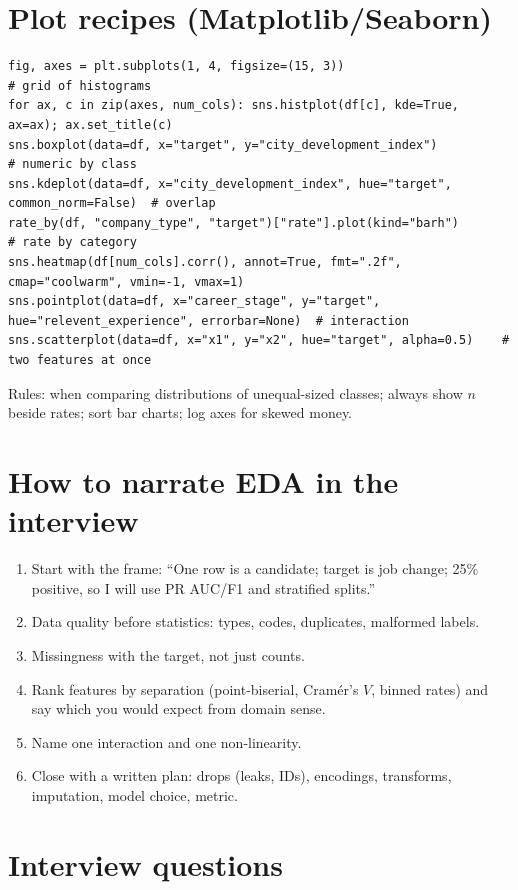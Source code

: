 \section{Plot recipes (Matplotlib/Seaborn)}
\begin{lstlisting}
fig, axes = plt.subplots(1, 4, figsize=(15, 3))                       # grid of histograms
for ax, c in zip(axes, num_cols): sns.histplot(df[c], kde=True, ax=ax); ax.set_title(c)
sns.boxplot(data=df, x="target", y="city_development_index")          # numeric by class
sns.kdeplot(data=df, x="city_development_index", hue="target", common_norm=False)  # overlap
rate_by(df, "company_type", "target")["rate"].plot(kind="barh")       # rate by category
sns.heatmap(df[num_cols].corr(), annot=True, fmt=".2f", cmap="coolwarm", vmin=-1, vmax=1)
sns.pointplot(data=df, x="career_stage", y="target", hue="relevent_experience", errorbar=None)  # interaction
sns.scatterplot(data=df, x="x1", y="x2", hue="target", alpha=0.5)    # two features at once
\end{lstlisting}
Rules:  when comparing distributions of unequal-sized classes; always show $n$ beside rates; sort bar charts; log axes for skewed money.

\section{How to narrate EDA in the interview}
\begin{enumerate}
\item Start with the frame: ``One row is a candidate; target is job change; 25\% positive, so I will use PR AUC/F1 and stratified splits.''
\item Data quality before statistics: types, codes, duplicates, malformed labels.
\item Missingness with the target, not just counts.
\item Rank features by separation (point-biserial, Cram\'er's $V$, binned rates) and say which you would expect from domain sense.
\item Name one interaction and one non-linearity.
\item Close with a written plan: drops (leaks, IDs), encodings, transforms, imputation, model choice, metric.
\end{enumerate}

\section{Interview questions}

